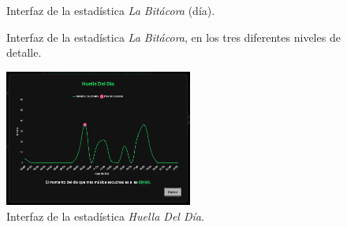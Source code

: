 \begin{figure}[H]
\begin{minipage}{0.32\textwidth}
        \caption{Interfaz de la estadística \textit{La Bitácora} (día).}
        \label{fig:la_bitacora_dia}
    \end{minipage}
    \caption{Interfaz de la estadística \textit{La Bitácora}, en los tres diferentes niveles de detalle.}
    \label{fig:la_bitacora}
\end{figure}

\begin{figure}[H]
    \centering
    \vspace{-10pt}
    \includegraphics[width=0.55\textwidth]{figures/capturas_ui/huella_del_dia.png}
    \caption{Interfaz de la estadística \textit{Huella Del Día}.}
    \label{fig:huella_del_dia}
\end{figure}

